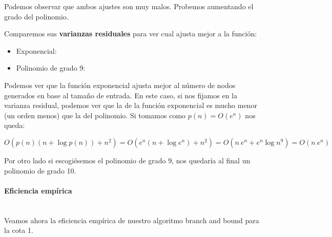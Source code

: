 \documentclass{article}
\newcommand{\myparagraph}[1]{\paragraph{#1}\mbox{}\\}
\begin{document}
Podemos observar que ambos ajustes son muy malos. Probemos aumentando el grado del polinomio.

Comparemos sus \textbf{varianzas residuales} para ver cual ajusta mejor a la función:
\begin{itemize}
    \item Exponencial:
    
    \item Polinomio de grado 9:
    
\end{itemize}

Podemos ver que la función exponencial ajusta mejor al número de nodos generados en base al tamaño de entrada. En este caso, si nos fijamos en la varianza residual, podemos ver que la de la función exponencial es mucho menor (un orden menos) que la del polinomio. Si tomamos como $p(n) = O(e^{n})$ nos queda:

\begin{equation*}
    O(p(n)(n + \log{p(n)}) + n^{2}) = O(e^{n}(n + \log{e^{n}}) + n^{2})
    = O(n\:e^{n} + e^{n}\log{n^{9}}) = O(n\:e^{n})
\end{equation*}

Por otro lado si escogiésemos el polinomio de grado 9, nos quedaría al final un polinomio de grado 10.

\myparagraph{Eficiencia empírica}

Veamos ahora la eficiencia empírica de nuestro algoritmo branch and bound para la cota 1.
\end{document}
